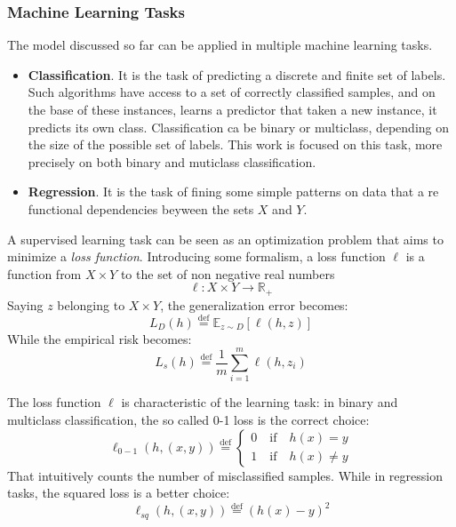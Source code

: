 \subsubsection{Machine Learning Tasks}
The model discussed so far can be applied in multiple machine learning tasks.
\begin{itemize}
	\item \textbf{Classification}. It is the task of predicting a discrete and finite set of labels. Such algorithms have access to a set of correctly classified samples, and on the base of these instances, learns a predictor that taken a new instance, it predicts its own class. Classification ca be binary or multiclass, depending on the size of the possible set of labels. This work is focused on this task, more precisely on both binary and muticlass classification.
	\item \textbf{Regression}. It is the task of fining some simple patterns on data that a re functional dependencies beyween the sets $X$ and $Y$.
\end{itemize}

A supervised learning task can be seen as an optimization problem that aims to minimize a \textit{loss function}. Introducing some formalism, a loss function $\ell$ is a function from $X \times Y$ to the set of non negative real numbers
\[\ell: X \times Y \rightarrow \mathbb{R}_+\]
Saying $z$ belonging to $X \times Y$, the generalization error becomes:
\[L_D(h) \stackrel{\text{def}}{=} \mathbb{E}_{z \sim D}[\ell (h,z)]\]
While the empirical risk becomes:
\[L_s(h)\stackrel{\text{def}}{=} \frac{1}{m} \sum_{i=1}^{m} \ell (h, z_i)\]

The loss function $\ell$ is characteristic of the learning task: in binary and multiclass classification, the so called 0-1 loss is the correct choice:
\[\ell_{0-1}(h, (x,y)) \stackrel{\text{def}}{=} 
	\begin{cases}
		0 \quad \textrm{if} \quad  h(x) = y\\
		1 \quad \textrm{if} \quad  h(x) \neq y
	\end{cases}\]
That intuitively counts the number of misclassified samples. While in regression tasks, the squared loss is a better choice:
\[\ell_{sq}(h,(x,y)) \stackrel{\text{def}}{=} (h(x)-y)^2\]




